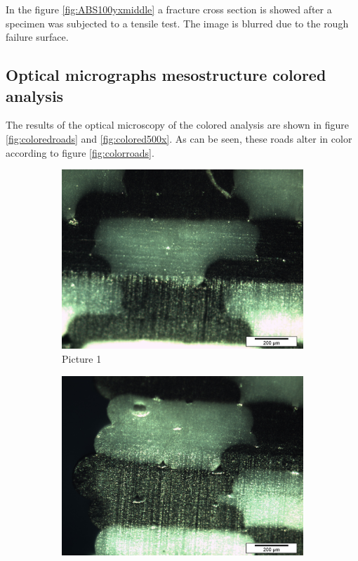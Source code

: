 In the figure \ref{fig:ABS100yxmiddle} a fracture cross section is showed after a specimen was subjected to a tensile test. The image is blurred due to the rough failure surface.

\subsection{Optical micrographs mesostructure colored analysis}

The results of the optical microscopy of the colored analysis are shown in figure \ref{fig:coloredroads} and \ref{fig:colored500x}. As can be seen, these roads alter in color according to figure \ref{fig:colorroads}. 
\begin{figure}
\centering
  \begin{subfigure}[b]{0.48\textwidth}
    \includegraphics[width=\textwidth]{chapter_4_RVE_Definition/figures/colored/Tv35_LI.jpg}
    \caption{Picture 1}
    \label{fig:1}
  \end{subfigure}
  \begin{subfigure}[b]{0.48\textwidth}
    \includegraphics[width=\textwidth]{chapter_4_RVE_Definition/figures/colored/Tv38_LI.jpg}

\end{subfigure}
\end{figure}
